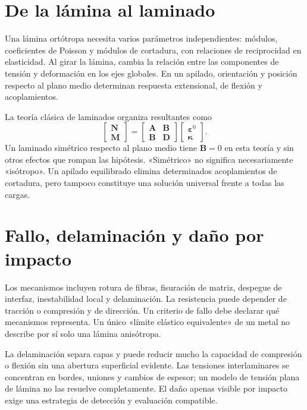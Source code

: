 \section{De la lámina al laminado}
Una lámina ortótropa necesita varios parámetros independientes: módulos, coeficientes de Poisson y módulos de cortadura, con relaciones de reciprocidad en elasticidad. Al girar la lámina, cambia la relación entre las componentes de tensión y deformación en los ejes globales. En un apilado, orientación y posición respecto al plano medio determinan respuesta extensional, de flexión y acoplamientos.

La teoría clásica de laminados organiza resultantes como
\begin{equation}\begin{bmatrix}\mathbf N\\\mathbf M\end{bmatrix}=\begin{bmatrix}\mathbf A&\mathbf B\\\mathbf B&\mathbf D\end{bmatrix}\begin{bmatrix}\boldsymbol\varepsilon^0\\\boldsymbol\kappa\end{bmatrix}.\label{eq:abd}\end{equation}
Un laminado simétrico respecto al plano medio tiene $\mathbf B=0$ en esta teoría y sin otros efectos que rompan las hipótesis. «Simétrico» no significa necesariamente «isótropo». Un apilado equilibrado elimina determinados acoplamientos de cortadura, pero tampoco constituye una solución universal frente a todas las cargas.
\section{Fallo, delaminación y daño por impacto}
Los mecanismos incluyen rotura de fibras, fisuración de matriz, despegue de interfaz, inestabilidad local y delaminación. La resistencia puede depender de tracción o compresión y de dirección. Un criterio de fallo debe declarar qué mecanismos representa. Un único «límite elástico equivalente» de un metal no describe por sí solo una lámina anisótropa.

La delaminación separa capas y puede reducir mucho la capacidad de compresión o flexión sin una abertura superficial evidente. Las tensiones interlaminares se concentran en bordes, uniones y cambios de espesor; un modelo de tensión plana de lámina no las resuelve completamente. El daño apenas visible por impacto exige una estrategia de detección y evaluación compatible.
